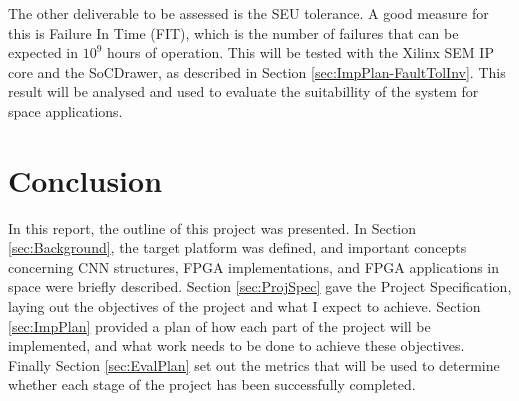 \documentclass[12pt]{article}
\begin{document}
The other deliverable to be assessed is the SEU tolerance. A good measure for this is Failure In Time (FIT), which is the number of failures that can be expected in $10^9$ hours of operation. This will be tested with the Xilinx SEM IP core and the SoCDrawer, as described in Section \ref{sec:ImpPlan-FaultTolInv}. This result will be analysed and used to evaluate the suitabillity of the system for space applications.

\section{Conclusion}
\label{sec:Conclusion}
\vspace{-12pt}

In this report, the outline of this project was presented. In Section \ref{sec:Background}, the target platform was defined, and important concepts concerning CNN structures, FPGA implementations, and FPGA applications in space were briefly described. Section \ref{sec:ProjSpec} gave the Project Specification, laying out the objectives of the project and what I expect to achieve. Section \ref{sec:ImpPlan} provided a plan of how each part of the project will be implemented, and what work needs to be done to achieve these objectives. Finally Section \ref{sec:EvalPlan} set out the metrics that will be used to determine whether each stage of the project has been successfully completed. 



\nocite{*}
\end{document}
